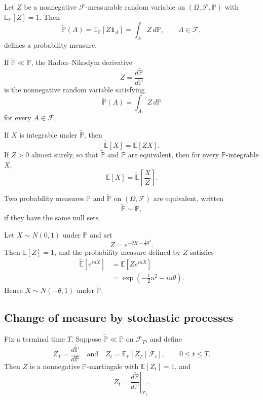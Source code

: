 \begin{thm}
Let $Z$ be a nonnegative $\mathcal{F}$-measurable random variable on $(\Omega,\mathcal{F},\mathbb{P})$ with $\mathbb{E}_{\mathbb{P}}[Z]=1$. Then
\[
\widetilde{\mathbb{P}}(A)
=
\mathbb{E}_{\mathbb{P}}[Z\mathbf{1}_A]
=
\int_A Z\,d\mathbb{P},
\qquad A\in\mathcal{F},
\]
defines a probability measure.
\end{thm}

\begin{de}
If $\widetilde{\mathbb{P}}\ll\mathbb{P}$, the Radon--Nikodym derivative
\[
Z=\frac{d\widetilde{\mathbb{P}}}{d\mathbb{P}}
\]
is the nonnegative random variable satisfying
\[
\widetilde{\mathbb{P}}(A)=\int_A Z\,d\mathbb{P}
\]
for every $A\in\mathcal{F}$.
\end{de}

\begin{thm}
If $X$ is integrable under $\widetilde{\mathbb{P}}$, then
\[
\widetilde{\mathbb{E}}[X]
=
\mathbb{E}[ZX].
\]
If $Z>0$ almost surely, so that $\widetilde{\mathbb{P}}$ and $\mathbb{P}$ are equivalent, then for every $\mathbb{P}$-integrable $X$,
\[
\mathbb{E}[X]
=
\widetilde{\mathbb{E}}\left[\frac{X}{Z}\right].
\]
\end{thm}

\begin{de}
Two probability measures $\mathbb{P}$ and $\widetilde{\mathbb{P}}$ on $(\Omega,\mathcal{F})$ are equivalent, written
\[
\widetilde{\mathbb{P}}\sim\mathbb{P},
\]
if they have the same null sets.
\end{de}

\begin{eg}
Let $X\sim N(0,1)$ under $\mathbb{P}$ and set
\[
Z=e^{-\theta X-\frac12\theta^2}.
\]
Then $\mathbb{E}[Z]=1$, and the probability measure defined by $Z$ satisfies
\[
\begin{aligned}
\widetilde{\mathbb{E}}[e^{iuX}]
&=
\mathbb{E}[Ze^{iuX}]\\
&=
\exp\left(-\frac12u^2-iu\theta\right).
\end{aligned}
\]
Hence $X\sim N(-\theta,1)$ under $\widetilde{\mathbb{P}}$.
\end{eg}

\subsection{Change of measure by stochastic processes}

Fix a terminal time $T$. Suppose $\widetilde{\mathbb{P}}\ll\mathbb{P}$ on $\mathcal{F}_T$, and define
\[
Z_T=\frac{d\widetilde{\mathbb{P}}}{d\mathbb{P}}
\quad\text{and}\quad
Z_t=\mathbb{E}_{\mathbb{P}}[Z_T\mid\mathcal{F}_t],
\qquad 0\leq t\leq T.
\]
Then $Z$ is a nonnegative $\mathbb{P}$-martingale with $\mathbb{E}[Z_t]=1$, and
\[
Z_t
=
\left.
\frac{d\widetilde{\mathbb{P}}}{d\mathbb{P}}
\right|_{\mathcal{F}_t}.
\]

